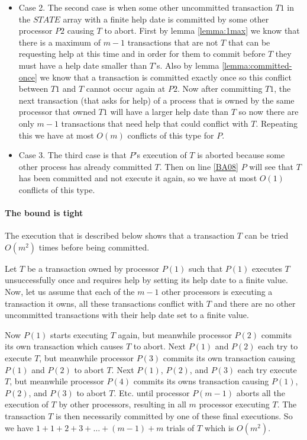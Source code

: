 \begin{proofT}
\begin{itemize}
\item
Case  2. The second case  is when  some  other uncommitted transaction
$T1$ in  the $\mathit{STATE}$  array with a  finite help  date is committed
by some other processor $P2$ causing $T$ to abort.
First by  lemma \ref{lemma:1max} we know  that there is a  maximum of $m-1$
transactions that are not $T$ that  can be requesting help at this time and
in order for them  to commit before $T$ they must have  a help date smaller
than $T$'s.
Also  by lemma  \ref{lemma:committed-once} we  know that  a  transaction is
committed exactly once  so this conflict between $T1$  and $T$ cannot occur
again at $P2$.
Now after committing  $T1$, the next transaction (that asks  for help) of a
process that  is owned by  the same processor  that owned $T1$ will  have a
larger help  date than $T$  so now there  are only $m-1$  transactions that
need help that could conflict with $T$.
Repeating this we have at most $O(m)$ conflicts of this type for $P$.
\item
Case  3. The  third case is  that $P$'s  execution of $T$  is aborted
because some other process has already committed $T$.
Then on  line \ref{BA08} $P$ will see  that $T$ has been  committed and not
execute it again, so we have at most $O(1)$ conflicts of this type.
\end{itemize}
\renewcommand{\toto}{proof:try-bounds}
\end{proofT}




\paragraph{The bound is tight}
The  execution that is described below shows that a  transaction $T$ 
can be tried  $O(m^2)$ times before being committed. 

Let  $T$ be a transaction owned by processor $P(1)$ such that 
$P(1)$ executes $T$ unsuccessfully once and requires help 
by setting its help date to a finite value. 
Now, let us assume that each of the  $m-1$ other processors  is 
executing a transaction it owns,  all  these  transactions
conflict with  $T$ and  there are no  other uncommitted  transactions with
their help date set to a finite value.
 
Now $P(1)$ starts executing $T$  again, but meanwhile processor $P(2)$ 
commits its own transaction which causes $T$ to abort. 
Next $P(1)$  and $P(2)$  each try to execute $T$, but meanwhile processor $P(3)$  
commits its own transaction causing $P(1)$ and $P(2)$ to abort $T$. 
Next $P(1)$, $P(2)$, and $P(3)$ each try execute $T$, but meanwhile processor 
$P(4)$ commits its owns transaction causing $P(1)$, $P(2)$, and $P(3)$ 
to abort  $T$. Etc.  until  processor  $P(m-1)$  aborts all  the  
execution of $T$ by  other processors, resulting in all $m$ processor 
executing $T$. The transaction $T$ is then  necessarily committed by one of 
these final executions. 
So we have $1+1+2+3+\ldots+(m-1)+m$ trials of $T$ which is  $O(m^2)$.

